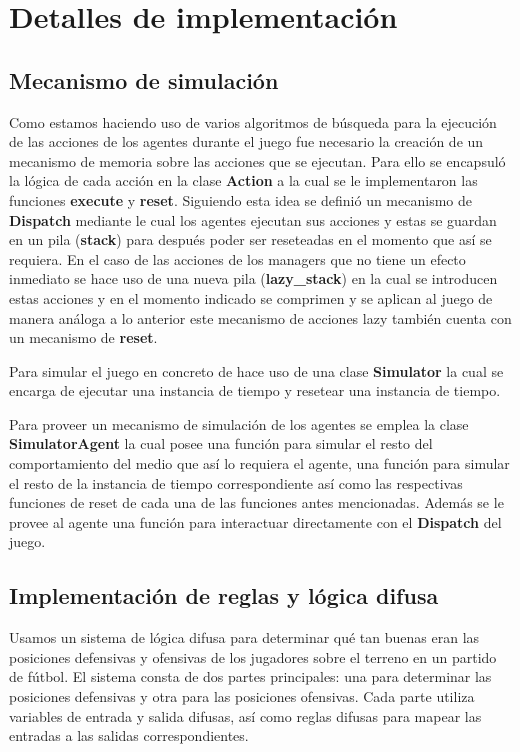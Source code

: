 \documentclass{article}
\begin{document}
\section{Detalles de implementación}

\subsection{Mecanismo de simulación}

Como estamos haciendo uso de varios algoritmos de búsqueda para la ejecución de las acciones de los agentes durante el juego
fue necesario la creación de un mecanismo de memoria sobre las acciones que se ejecutan. Para ello se encapsuló la lógica de cada 
acción en la clase \textbf{Action} a la cual se le implementaron las funciones \textbf{execute} y \textbf{reset}. Siguiendo esta idea se definió
un mecanismo de \textbf{Dispatch} mediante le cual los agentes ejecutan sus acciones y estas se guardan en un pila (\textbf{stack}) para después poder 
ser reseteadas en el momento que así se requiera. En el caso de las acciones de los managers que no tiene un efecto inmediato se hace 
uso de una nueva pila (\textbf{lazy\_stack}) en la cual se introducen estas acciones y en el momento indicado se comprimen y se aplican
al juego de manera análoga a lo anterior este mecanismo de acciones lazy también cuenta con un mecanismo de \textbf{reset}.

Para simular el juego en concreto de hace uso de una clase \textbf{Simulator} la cual se encarga de ejecutar una instancia de tiempo
y resetear una instancia de tiempo.

Para proveer un mecanismo de simulación de los agentes se emplea la clase \textbf{SimulatorAgent} la cual posee una función para simular 
el resto del comportamiento del medio que así lo requiera el agente, una función para simular el resto de la instancia de tiempo correspondiente
así como las respectivas funciones de reset de cada una de las funciones antes mencionadas. Además se le provee al agente una función para interactuar
directamente con el \textbf{Dispatch} del juego.

\subsection{Implementación de reglas y lógica difusa}

Usamos un sistema de lógica difusa para determinar qué tan buenas eran las posiciones defensivas y ofensivas de los jugadores 
sobre el terreno en un partido de fútbol. El sistema consta de dos partes principales: una para determinar las posiciones 
defensivas y otra para las posiciones ofensivas. Cada parte utiliza variables de entrada y salida difusas, así como reglas 
difusas para mapear las entradas a las salidas correspondientes.
\end{document}
